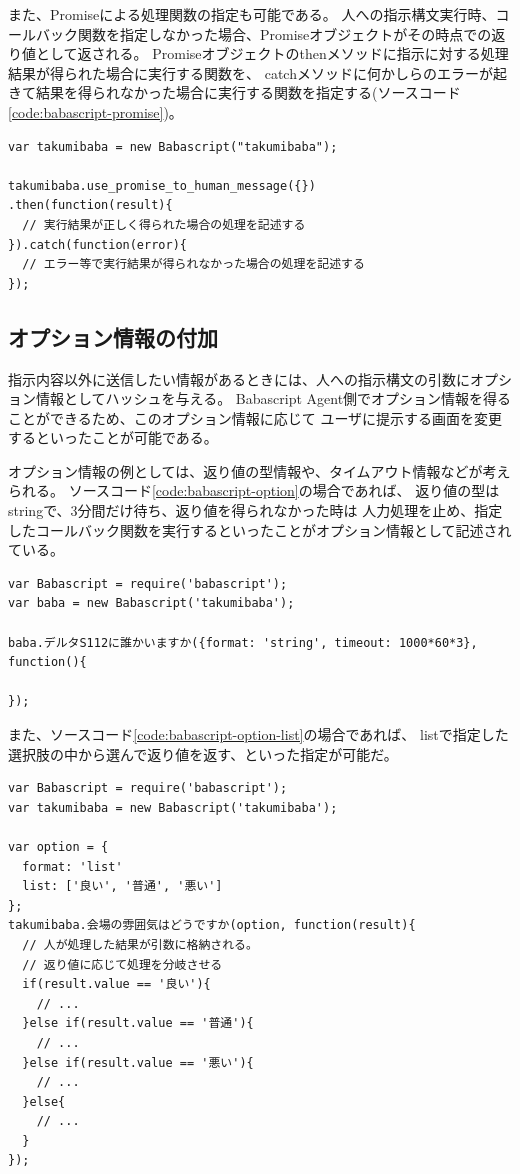 また、Promiseによる処理関数の指定も可能である。
人への指示構文実行時、コールバック関数を指定しなかった場合、Promiseオブジェクトがその時点での返り値として返される。
Promiseオブジェクトのthenメソッドに指示に対する処理結果が得られた場合に実行する関数を、
catchメソッドに何かしらのエラーが起きて結果を得られなかった場合に実行する関数を指定する(ソースコード\ref{code:babascript-promise})。

\begin{lstlisting}[caption=Promiseによる関数指定, label=code:babascript-promise]
var takumibaba = new Babascript("takumibaba");

takumibaba.use_promise_to_human_message({})
.then(function(result){
  // 実行結果が正しく得られた場合の処理を記述する
}).catch(function(error){
  // エラー等で実行結果が得られなかった場合の処理を記述する
});
\end{lstlisting}

\subsection{オプション情報の付加}\label{ux30aaux30d7ux30b7ux30e7ux30f3ux60c5ux5831ux306eux4ed8ux52a0}

指示内容以外に送信したい情報があるときには、人への指示構文の引数にオプション情報としてハッシュを与える。
Babascript
Agent側でオプション情報を得ることができるため、このオプション情報に応じて
ユーザに提示する画面を変更するといったことが可能である。

オプション情報の例としては、返り値の型情報や、タイムアウト情報などが考えられる。
ソースコード\ref{code:babascript-option}の場合であれば、
返り値の型はstringで、3分間だけ待ち、返り値を得られなかった時は
人力処理を止め、指定したコールバック関数を実行するといったことがオプション情報として記述されている。

\begin{lstlisting}[caption=オプション情報のサンプルソースコードその1, label=code:babascript-option]
var Babascript = require('babascript');
var baba = new Babascript('takumibaba');

baba.デルタS112に誰かいますか({format: 'string', timeout: 1000*60*3}, function(){

});
\end{lstlisting}

また、ソースコード\ref{code:babascript-option-list}の場合であれば、
listで指定した選択肢の中から選んで返り値を返す、といった指定が可能だ。

\begin{lstlisting}[caption=オプション情報のサンプルソースコードその2, label=code:babascript-option-list]
var Babascript = require('babascript');
var takumibaba = new Babascript('takumibaba');

var option = {
  format: 'list'
  list: ['良い', '普通', '悪い']
};
takumibaba.会場の雰囲気はどうですか(option, function(result){
  // 人が処理した結果が引数に格納される。
  // 返り値に応じて処理を分岐させる
  if(result.value == '良い'){
    // ...
  }else if(result.value == '普通'){
    // ...
  }else if(result.value == '悪い'){
    // ...
  }else{
    // ...
  }
});

\end{lstlisting}

